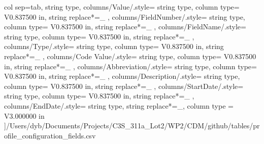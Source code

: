 \begin{landscape}
    col sep=tab,
    string type,
    columns/Value/.style={
            string type, 
            column type= V{0.837500 in}, 
            string replace*={_}{}
        },
    columns/FieldNumber/.style={
            string type, 
            column type= V{0.837500 in}, 
            string replace*={_}{}
        },
    columns/FieldName/.style={
            string type, 
            column type= V{0.837500 in}, 
            string replace*={_}{}
        },
    columns/Type/.style={
            string type, 
            column type= V{0.837500 in}, 
            string replace*={_}{}
        },
    columns/Code Value/.style={
            string type, 
            column type= V{0.837500 in}, 
            string replace*={_}{}
        },
    columns/Abbreviation/.style={
            string type, 
            column type= V{0.837500 in}, 
            string replace*={_}{}
        },
    columns/Description/.style={
            string type, 
            column type= V{0.837500 in}, 
            string replace*={_}{}
        },
    columns/StartDate/.style={
            string type, 
            column type= V{0.837500 in}, 
            string replace*={_}{}
        },
    columns/EndDate/.style={
            string type, 
            string replace*={_}{},
            column type = V{3.000000 in}
        }
    ]{/Users/dyb/Documents/Projects/C3S_311a_Lot2/WP2/CDM/github/tables/profile_configuration_fields.csv}
\end{landscape}
